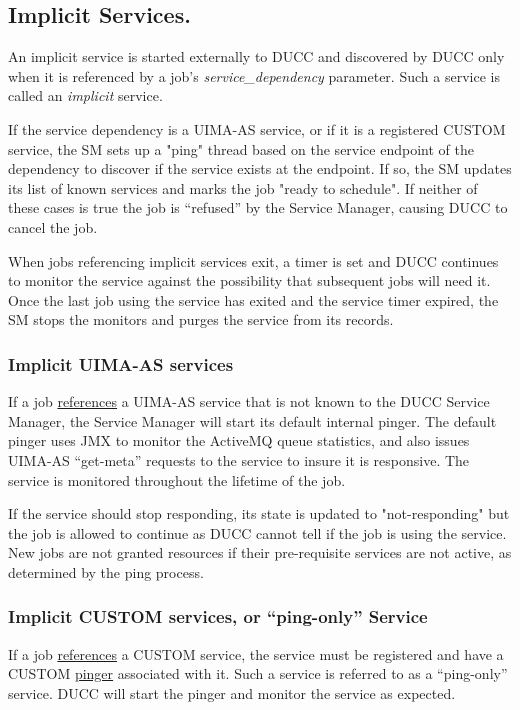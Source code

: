       \subsection{Implicit Services.} 
      \label{sec:services.implicit}
      An implicit service is started externally to DUCC and discovered by DUCC only when it is
      referenced by a job's {\em service\_dependency} parameter.  Such a service is called
      an {\em implicit} service.

      If the service dependency is a UIMA-AS service, or if it is a registered CUSTOM service,
      the SM sets up a "ping" thread based on the
      service endpoint of the dependency to discover if the service exists at the endpoint. If so,
      the SM updates its list of known services and marks the job "ready to schedule".  If neither
      of these cases is true the job is ``refused'' by the Service Manager, causing DUCC to cancel
      the job.

      When jobs referencing implicit services exit, a timer is set and DUCC continues to monitor the
      service against the possibility that subsequent jobs will need it. Once the last job using the
      service has exited and the service timer expired, the SM stops the monitors and purges the
      service from its records.

      \subsubsection{Implicit UIMA-AS services}
      If a job \hyperref[sec:service.endpoints]{references} a UIMA-AS service that is not known to the
      DUCC Service Manager, the Service Manager will start
      its default internal pinger.  The default pinger uses JMX to monitor the ActiveMQ queue statistics,
      and also issues UIMA-AS ``get-meta'' requests to the service to insure it is responsive.  The
      service is monitored throughout the lifetime of the job. 

      If the service should stop
      responding, its state is updated to "not-responding" but the job is allowed to continue as
      DUCC cannot tell if the job is using the service.  New jobs are not granted resources if
      their pre-requisite services are not active, as determined by the ping process.

      \subsubsection{Implicit CUSTOM services, or ``ping-only'' Service} 
      If a job \hyperref[sec:service.endpoints]{references} a CUSTOM service, the service must be
      registered and have a CUSTOM \hyperref[sec:service.pingers]{pinger} associated with it. Such a
      service is referred to as a ``ping-only'' service.  DUCC will start the pinger and monitor the
      service as expected.  

